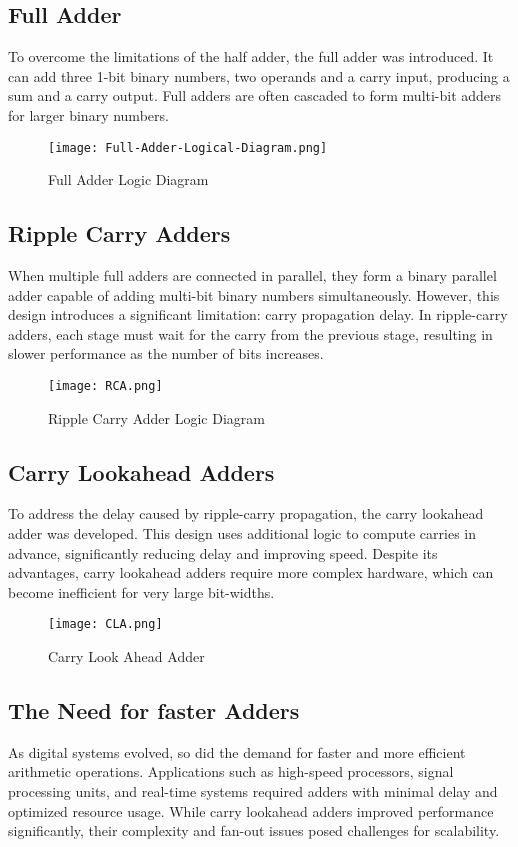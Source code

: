 \documentclass{IEEEtran}
\begin{document}
\subsection{Full Adder}
To overcome the limitations of the half adder, the full adder was introduced. It can add three 1-bit binary numbers, two operands and a carry input, producing a sum and a carry output. Full adders are often cascaded to form multi-bit adders for larger binary numbers.
\begin{figure}[H]
    \centering
    \texttt{[image: Full-Adder-Logical-Diagram.png]}
    \caption{Full Adder Logic Diagram}
    \label{fig:enter-label}
\end{figure}


\subsection{Ripple Carry Adders}
When multiple full adders are connected in parallel, they form a binary parallel adder capable of adding multi-bit binary numbers simultaneously. However, this design introduces a significant limitation: carry propagation delay. In ripple-carry adders, each stage must wait for the carry from the previous stage, resulting in slower performance as the number of bits increases.
\begin{figure}[H]
    \centering
    \texttt{[image: RCA.png]}
    \caption{Ripple  Carry Adder Logic Diagram}
    \label{fig:enter-label}
\end{figure}

\subsection{Carry Lookahead Adders}
To address the delay caused by ripple-carry propagation, the carry lookahead adder was developed. This design uses additional logic to compute carries in advance, significantly reducing delay and improving speed. Despite its advantages, carry lookahead adders require more complex hardware, which can become inefficient for very large bit-widths.
\begin{figure}[H]
    \centering
    \texttt{[image: CLA.png]}
    \caption{Carry Look Ahead Adder}
    \label{fig:enter-label}
\end{figure}
\subsection{The Need for faster Adders}
As digital systems evolved, so did the demand for faster and more efficient arithmetic operations. Applications such as high-speed processors, signal processing units, and real-time systems required adders with minimal delay and optimized resource usage. While carry lookahead adders improved performance significantly, their complexity and fan-out issues posed challenges for scalability.
\end{document}
